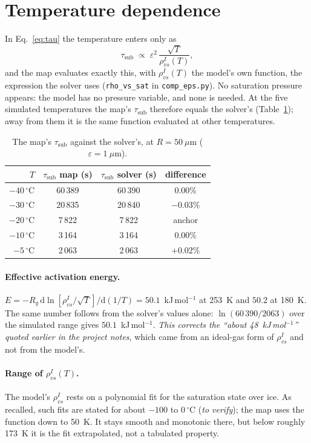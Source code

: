 \documentclass[11pt]{article}
\newcommand{\degC}{\,^{\circ}\mathrm{C}}
\newcommand{\taus}{\tau_{\mathrm{sub}}}
\newcommand{\rvs}{\rho_{vs}^{I}}
\begin{document}
\section{Temperature dependence}

In Eq.~\eqref{eq:tau} the temperature enters only as
\begin{equation}
  \taus \;\propto\; \varepsilon^{2}\,\frac{\sqrt{T}}{\rvs(T)} ,
  \label{eq:Tdep}
\end{equation}
and the map evaluates exactly this, with $\rvs(T)$ the model's own function,
the expression the solver uses (\texttt{rho\_vs\_sat} in
\texttt{comp\_eps.py}). No saturation pressure appears: the model has no pressure
variable, and none is needed. At the five simulated temperatures the map's
$\taus$ therefore equals the solver's (Table~\ref{tab:compare}); away from
them it is the same function evaluated at other temperatures.

\begin{table}[h]\centering
\caption{The map's $\taus$ against the solver's, at $R = 50~\mu$m
($\varepsilon = 1~\mu$m).}\label{tab:compare}
\begin{tabular}{rccc}\toprule
$T$ & $\taus$ map (s) & $\taus$ solver (s) & difference\\\midrule
$-40\degC$ & 60\,389 & 60\,390 & $0.00\%$\\
$-30\degC$ & 20\,835 & 20\,840 & $-0.03\%$\\
$-20\degC$ & 7\,822 & 7\,822 & anchor\\
$-10\degC$ & 3\,164 & 3\,164 & $0.00\%$\\
$-5\degC$ & 2\,063 & 2\,063 & $+0.02\%$\\\bottomrule
\end{tabular}\end{table}

\paragraph{Effective activation energy.}
$E = -R_g\,\mathrm{d}\ln[\rvs/\sqrt{T}]/\mathrm{d}(1/T) = 50.1$~kJ\,mol$^{-1}$
at 253~K and $50.2$ at 180~K. The same number follows from the solver's values
alone: $\ln(60\,390/2063)$ over the simulated range gives $50.1$~kJ\,mol$^{-1}$.
\emph{This corrects the ``about 48~kJ\,mol$^{-1}$'' quoted earlier in the
project notes}, which came from an ideal-gas form of $\rvs$ and not from the
model's.

\paragraph{Range of $\rvs(T)$.} The model's $\rvs$ rests on a polynomial fit
for the saturation state over ice. As recalled, such fits are stated for about
$-100$ to $0\degC$ (\emph{to verify}); the map uses the function down to 50~K.
It stays smooth and monotonic there, but below roughly 173~K it is the fit
extrapolated, not a tabulated property.
\end{document}
